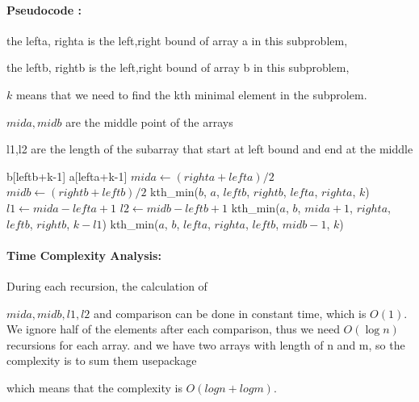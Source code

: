\begin{parts}
\begin{solution}
        \paragraph{Pseudocode :}
        the lefta, righta is the left,right bound of array a in this subproblem,

        the leftb, rightb is the left,right bound of array b in this subproblem,

        $k$ means that we need to find the kth minimal element in the subprolem.

        $mida,midb$ are the middle point of the arrays

        l1,l2 are the length of the subarray that start at left bound and end at the middle
        \begin{algorithm}[H]
          \begin{algorithmic}[1]
            \State \Return b[leftb+k-1]
            \EndIf
            \State \Return a[lefta+k-1]
            \EndIf
            \State $mida\gets (righta+lefta)/2$
            \State $midb\gets (rightb+leftb)/2$
            \State \Return kth\_min($b$, $a$, $leftb$, $rightb$, $lefta$, $righta$, $k$)
            \EndIf
            \State $l1\gets mida-lefta+1$
            \State $l2\gets midb-leftb+1$
            \State \Return kth\_min($a$, $b$, $mida+1$, $righta$, $leftb$, $rightb$, $k-l1$)
            \Else
            \State \Return kth\_min($a$, $b$, $lefta$, $righta$, $leftb$, $midb-1$, $k$) 
            \EndIf   		
            \EndFunction
          \end{algorithmic}
        \end{algorithm}

        \paragraph{Time Complexity Analysis:}
        During each recursion, the calculation of 
        
        $mida,midb,l1,l2$ and comparison can be done in constant time, which is $O(1)$. 
        We ignore half of the elements after each comparison, thus we need $O(\log n)$ recursions for each array.
        and we have two arrays with length of n and m, so the complexity is to sum them usepackage

        which means that the complexity is $O(log n + log m)$.
      \end{solution}

\end{parts}

